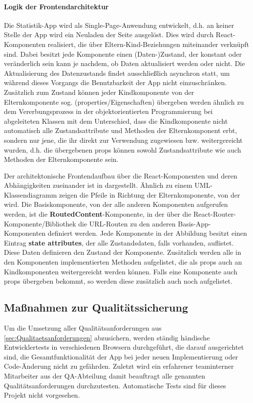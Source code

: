 \paragraph{Logik der Frontendarchitektur}
Die Statistik-App wird als Single-Page-Anwendung entwickelt, d.h. an keiner Stelle der App wird ein Neuladen der Seite ausgelöst. Dies wird durch React-Komponenten realisiert, die über Eltern-Kind-Beziehungen miteinander verknüpft sind. Dabei besitzt jede Komponente einen (Daten-)Zustand, der konstant oder veränderlich sein kann je nachdem, ob Daten aktualisiert werden oder nicht. Die Aktualisierung des Datenzustands findet ausschließlich asynchron statt, um während dieses Vorgangs die Benutzbarkeit der App nicht einzuschränken. Zusätzlich zum Zustand können jeder Kindkomponente von der Elternkomponente sog.  (properties/Eigenschaften) übergeben werden ähnlich zu dem Vererbungsprozess in der objektorientierten Programmierung bei abgeleiteten Klassen mit dem Unterschied, dass die Kindkomponente nicht automatisch alle Zustandsattribute und Methoden der Elternkomponent erbt, sondern nur jene, die ihr direkt zur Verwendung zugewiesen bzw. weitergereicht wurden, d.h. die übergebenen props können sowohl Zustandsattribute wie auch Methoden der Elternkomponente sein.

Der architektonische Frontendaufbau über die React-Komponenten und deren Abhängigkeiten zueinander ist in  dargestellt. 
Ähnlich zu einem UML-Klassendiagramm zeigen die Pfeile in Richtung der Elternkomponente, von der  wird. Die Basiskomponente, von der alle anderen Komponenten aufgerufen werden, ist die \textbf{RoutedContent}-Komponente, in der über die React-Router-Komponente/Bibliothek die URL-Routen zu den anderen Basis-App-Komponenten definiert werden. Jede Komponente in der Abbildung besitzt einen Eintrag \textbf{state attributes}, der alle Zustandsdaten, falls vorhanden, auflistet. Diese Daten definieren den Zustand der Komponente. Zusätzlich werden alle in den Komponenten implementierten Methoden aufgelistet, die als props auch an Kindkomponenten weitergereicht werden können. Falls eine Komponente auch props übergeben bekommt, so werden diese zusätzlich auch noch aufgelistet.

\subsection{Maßnahmen zur Qualitätssicherung}
\label{sec:Qualitaetssicherung}

Um die Umsetzung aller Qualitätsanforderungen aus \ref{sec:Qualitaetsanforderungen} abzusichern, werden ständig händische Entwicklertests in verschiedenen Browsern durchgeführt, die darauf ausgerichtet sind, die Gesamtfunktionalität der App bei jeder neuen Implementierung oder Code-Änderung nicht zu gefährden. Zuletzt wird ein erfahrener teaminterner Mitarbeiter aus der QA-Abteilung damit beauftragt alle genannten Qualitätsanforderungen durchzutesten. Automatische Tests sind für dieses Projekt nicht vorgesehen.
